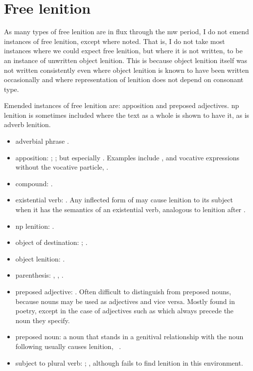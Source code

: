 \section{Free lenition}
\label{sec:free-lenition-1}
As many types of free lenition are in flux through the \gls{mw} period, I do not emend instances of free lenition, except where noted. That is, I do not take most instances where we could expect free lenition,  but where it is not written, to be an instance of \eg unwritten object lenition. This is because object lenition itself was not written consistently even where object lenition is known to have been written occasionally and where representation of lenition does not depend on consonant type.

Emended instances of free lenition are: apposition and preposed adjectives. \gls{np} lenition is sometimes included where the text as a whole is shown to have it, as is adverb lenition.
\begin{itemize}
\item adverbial phrase \textcite[§~19, 22]{evans_grammar_1964}.
\item apposition: \textcite[§~19]{evans_grammar_1964}; \textcite[116--9, 122--3]{morgan_y_1952}; but especially \textcite{schrijver_free_2010}. Examples include , and vocative expressions without the vocative particle, \eg {}.
\item compound: \textcite[§~20, 22]{evans_grammar_1964}. 
\item existential verb:  \textcite[29--30]{van_development14}. Any inflected form of  may cause lenition to its subject when it has the semantics of an existential verb, analogous to lenition after .
\item \gls{np} lenition: \textcite[§~21]{evans_grammar_1964}.
\item object of destination: \textcite[227]{morgan_y_1952}; \textcite[§~21]{evans_grammar_1964}. 
\item object lenition: \textcite[§~21]{evans_grammar_1964}.
\item parenthesis: \textcite[429]{morgan_y_1952}, \textcite[§~21]{evans_grammar_1964}, \textcite[5--6]{schrijver_free_2010}.
\item preposed adjective: \textcite[35]{morgan_y_1952}. Often difficult to distinguish from preposed nouns, because nouns may be used as adjectives and vice versa. Mostly found in poetry, except in the case of adjectives such as  which always precede the noun  they specify.
\item preposed noun: a noun that stands in a genitival relationship with the noun following usually causes lenition, \eg {}~\autocite{daniel_cyfuniadau_2003}.
\item subject to plural verb: \textcite[§~21]{evans_grammar_1964}; \textcite[2]{schrijver_free_2010}, although \textcite{van_development14} fails to find lenition in this environment.
\end{itemize}



